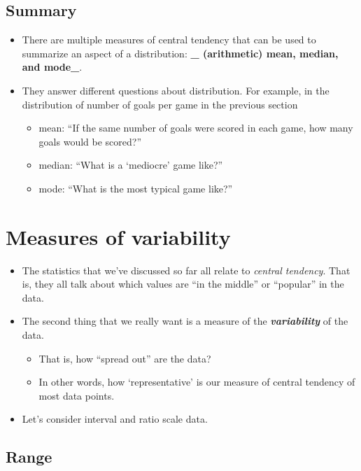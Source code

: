\documentclass[
]{book}
\providecommand{\tightlist}{%
  \setlength{\itemsep}{0pt}\setlength{\parskip}{0pt}}
\begin{document}
\subsection{Summary}\label{summary}

\begin{itemize}
\tightlist
\item
  There are multiple measures of central tendency that can be used to summarize an aspect of a distribution: \textbf{\_ (arithmetic) mean, median, and mode\_}.
\item
  They answer different questions about distribution. For example, in the distribution of number of goals per game in the previous section

  \begin{itemize}
  \tightlist
  \item
    mean: ``If the same number of goals were scored in each game, how many goals would be scored?''
  \item
    median: ``What is a `mediocre' game like?''
  \item
    mode: ``What is the most typical game like?''
  \end{itemize}
\end{itemize}

\section{Measures of variability}\label{var}

\begin{itemize}
\tightlist
\item
  The statistics that we've discussed so far all relate to \emph{central tendency}. That is, they all talk about which values are ``in the middle'' or ``popular'' in the data.
\item
  The second thing that we really want is a measure of the \textbf{\emph{variability}} of the data.

  \begin{itemize}
  \tightlist
  \item
    That is, how ``spread out'' are the data?
  \item
    In other words, how `representative' is our measure of central tendency of most data points.
  \end{itemize}
\item
  Let's consider interval and ratio scale data.
\end{itemize}

\subsection{Range}\label{range}
\end{document}
